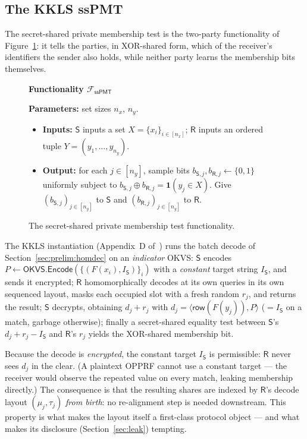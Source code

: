 \documentclass[runningheads]{llncs}
\newenvironment{funcbox}
  {\begin{lrbox}{\funcboxsave}\begin{minipage}{0.93\linewidth}\smallskip}
  {\smallskip\end{minipage}\end{lrbox}\begin{center}\fbox{\usebox{\funcboxsave}}\end{center}}
\newcommand{\Okvs}{\mathsf{OKVS}}
\newcommand{\Snd}{\mathsf{S}}                %
\newcommand{\Rcv}{\mathsf{R}}                %
\newcommand{\row}{\mathsf{row}}
\newcommand{\Fsspmt}{\mathcal{F}_{\mathsf{ssPMT}}}
\begin{document}
\subsection{The KKLS ssPMT}
\label{sec:prelim:sspmt}

The secret-shared private membership test is the two-party functionality of
Figure~\ref{fig:sspmt}: it tells the parties, in XOR-shared form, which of the
receiver's identifiers the sender also holds, while neither party learns the
membership bits themselves.

\begin{figure}[t]
\begin{funcbox}
\begin{center}
  \textbf{Functionality $\Fsspmt$}
\end{center}
\textbf{Parameters:} set sizes $n_x$, $n_y$.
\begin{itemize}
  \item[] \textbf{Inputs:} $\Snd$ inputs a set $X=\{x_i\}_{i\in[n_x]}$; $\Rcv$ inputs an
  ordered tuple $Y=(y_1,\dots,y_{n_y})$.
  \item[] \textbf{Output:} for each $j\in[n_y]$, sample bits
  $b_{\Snd,j},b_{\Rcv,j}\gets\{0,1\}$ uniformly subject to
  $b_{\Snd,j}\oplus b_{\Rcv,j}=\mathbf 1(y_j\in X)$. Give $(b_{\Snd,j})_{j\in[n_y]}$ to
  $\Snd$ and $(b_{\Rcv,j})_{j\in[n_y]}$ to $\Rcv$.
\end{itemize}
\end{funcbox}
\caption{The secret-shared private membership test functionality.}
\label{fig:sspmt}
\end{figure}

The KKLS instantiation (Appendix~D of~\cite{EPRINT:KwaKwoLeeSon26}) runs the batch
decode of Section~\ref{sec:prelim:homdec} on an \emph{indicator} OKVS: $\Snd$ encodes
$P\gets\Okvs.\mathsf{Encode}(\{(F(x_i),I_\Snd)\}_i)$ with a \emph{constant} target
string $I_\Snd$, and sends it encrypted; $\Rcv$ homomorphically decodes at its own
queries in its own sequenced layout, masks each occupied slot with a fresh random
$r_j$, and returns the result; $\Snd$ decrypts, obtaining
$d_j+r_j$ with $d_j=\langle\row(F(y_j)),P\rangle$ ($=I_\Snd$ on a match, garbage
otherwise); finally a secret-shared equality test between $\Snd$'s
$d_j+r_j-I_\Snd$ and $\Rcv$'s $r_j$ yields the XOR-shared membership bit.

\begin{remark}\label{rmk:bornaligned}
Because the decode is \emph{encrypted}, the constant target $I_\Snd$ is permissible:
$\Rcv$ never sees $d_j$ in the clear. (A plaintext OPPRF cannot use a constant
target --- the receiver would observe the repeated value on every match, leaking
membership directly.) The consequence is that the resulting shares are indexed by
$\Rcv$'s decode layout $(\mu_j,\tau_j)$ \emph{from birth}: no re-alignment step is
needed downstream. This property is what makes the layout itself a first-class
protocol object --- and what makes its disclosure (Section~\ref{sec:leak}) tempting.
\end{remark}
\end{document}
